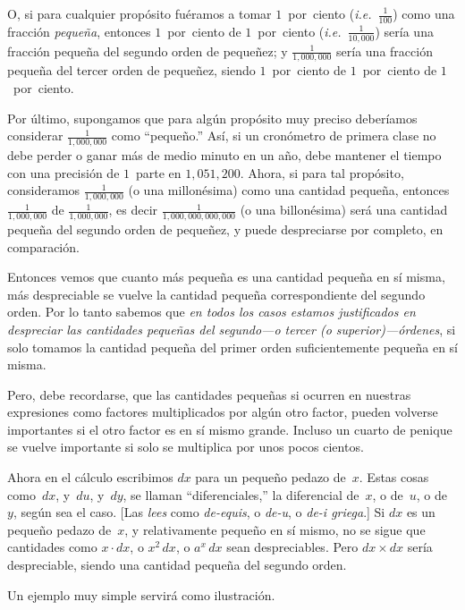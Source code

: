 \documentclass[12pt]{book}[2005/09/16]
\newcommand{\DPPageSep}[2]{\Pagelabel{#2}}
\newcommand{\Pagelabel}[1]
  {\phantomsection\label{#1}}
\newcommand{\IE}{\textit{i.e.}}
\begin{document}
O, si para cualquier propósito fuéramos a tomar $1$~por~ciento
(\IE~$\frac{1}{100}$) como una fracción \emph{pequeña}, entonces $1$~por~ciento de
$1$~por~ciento (\IE~$\frac{1}{10,000}$) sería una fracción pequeña
del segundo orden de pequeñez; y $\frac{1}{1,000,000}$ sería
\DPPageSep{017.png}{5}%
una fracción pequeña del tercer orden de pequeñez,
siendo $1$~por~ciento de $1$~por~ciento de $1$~por~ciento.

Por último, supongamos que para algún propósito muy preciso
deberíamos considerar $\frac{1}{1,000,000}$ como ``pequeño.'' Así, si un
cronómetro de primera clase no debe perder o ganar más de
medio minuto en un año, debe mantener el tiempo con una
precisión de $1$~parte en $1,051,200$. Ahora, si para tal
propósito, consideramos $\frac{1}{1,000,000}$ (o una millonésima) como una
cantidad pequeña, entonces $\frac{1}{1,000,000}$ de $\frac{1}{1,000,000}$, es decir
$\frac{1}{1,000,000,000,000}$ (o una billonésima) será una cantidad pequeña
del segundo orden de pequeñez, y puede
despreciarse por completo, en comparación.

Entonces vemos que cuanto más pequeña es una cantidad pequeña en sí
misma, más despreciable se vuelve la cantidad pequeña
correspondiente del segundo orden. Por lo tanto
sabemos que \emph{en todos los casos estamos justificados en despreciar
las cantidades pequeñas del segundo---o tercer \emph{(o
superior)}---órdenes}, si solo tomamos la cantidad pequeña
del primer orden suficientemente pequeña en sí misma.

Pero, debe recordarse, que las cantidades pequeñas
si ocurren en nuestras expresiones como factores multiplicados
por algún otro factor, pueden volverse importantes si el
otro factor es en sí mismo grande. Incluso un cuarto de penique se vuelve
importante si solo se multiplica por unos pocos cientos.

Ahora en el cálculo escribimos $dx$ para un pequeño pedazo
de~$x$. Estas cosas como~$dx$, y~$du$, y~$dy$, se
llaman ``diferenciales,'' la diferencial de~$x$, o de~$u$,
o de~$y$, según sea el caso. [Las \emph{lees} como
\emph{de-equis}, o \emph{de-u}, o \emph{de-i griega}.] Si $dx$ es un pequeño pedazo
de~$x$, y relativamente pequeño en sí mismo, no se sigue
\DPPageSep{018.png}{6}%
que cantidades como $x · dx$, o $x^2\, dx$, o $a^x\, dx$ sean
despreciables. Pero $dx × dx$ sería despreciable, siendo una
cantidad pequeña del segundo orden.

Un ejemplo muy simple servirá como ilustración.
\end{document}
